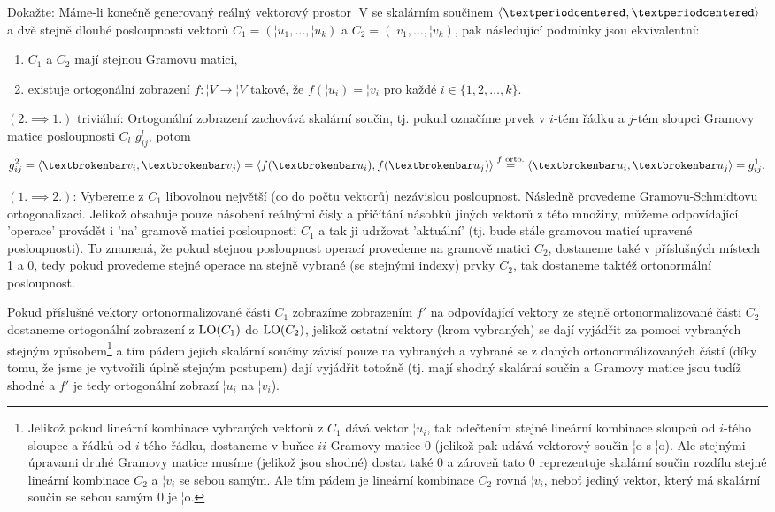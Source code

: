 \documentclass[10pt]{article}                   %
\begin{document}
\begin{priklad}[3.2*]
    Dokažte: Máme-li konečně generovaný reálný vektorový prostor ¦V se skalárním součinem $\<·, ·\>$ a dvě stejně dlouhé posloupnosti vektorů $C_1 = (¦u_1, …, ¦u_k)$ a $C_2 = (¦v_1, …, ¦v_k)$, pak následující podmínky jsou ekvivalentní:
    
    \begin{enumerate}
        \item $C_1$ a $C_2$ mají stejnou Gramovu matici,

        \item existuje ortogonální zobrazení $f: ¦V \rightarrow ¦V$ takové, že $f(¦u_i) = ¦v_i$ pro každé $i \in \{1, 2, …, k\}$.
    \end{enumerate}

    \begin{dukazin}
        $(2. \implies 1.)$ triviální: Ortogonální zobrazení zachovává skalární součin, tj. pokud označíme prvek v $i$-tém řádku a $j$-tém sloupci Gramovy matice posloupnosti $C_l$ $g^l_{ij}$, potom
        $$ g^2_{ij} = \<¦v_i, ¦v_j\> = \<f(¦u_i), f(¦u_j)\> \overset{\text{$f$ orto.}}{=} \<¦u_i, ¦u_j\> = g^1_{ij}. $$

        $(1. \implies 2.)$: Vybereme z $C_1$ libovolnou největší (co do počtu vektorů) nezávislou posloupnost. Následně provedeme Gramovu-Schmidtovu ortogonalizaci. Jelikož obsahuje pouze násobení reálnými čísly a přičítání násobků jiných vektorů z této množiny, můžeme odpovídající 'operace' provádět i 'na' gramově matici posloupnosti $C_1$ a tak ji udržovat 'aktuální' (tj. bude stále gramovou maticí upravené posloupnosti). To znamená, že pokud stejnou posloupnost operací provedeme na gramově matici $C_2$, dostaneme také v příslušných místech 1 a 0, tedy pokud provedeme stejné operace na stejně vybrané (se stejnými indexy) prvky $C_2$, tak dostaneme taktéž ortonormální posloupnost.

        Pokud příslušné vektory ortonormalizované části $C_1$ zobrazíme zobrazením $f'$ na odpovídající vektory ze stejně ortonormalizované části $C_2$ dostaneme ortogonální zobrazení z $\operatorname{LO}(C_1)$ do $\operatorname{LO}(C_2)$, jelikož ostatní vektory (krom vybraných) se dají vyjádřit za pomoci vybraných stejným způsobem\footnote{Jelikož pokud lineární kombinace vybraných vektorů z $C_1$ dává vektor $¦u_i$, tak odečtením stejné lineární kombinace sloupců od $i$-tého sloupce a řádků od $i$-tého řádku, dostaneme v buňce $ii$ Gramovy matice 0 (jelikož pak udává vektorový součin ¦o s ¦o). Ale stejnými úpravami druhé Gramovy matice musíme (jelikož jsou shodné) dostat také 0 a zároveň tato 0 reprezentuje skalární součin rozdílu stejné lineární kombinace $C_2$ a $¦v_i$ se sebou samým. Ale tím pádem je lineární kombinace $C_2$ rovná $¦v_i$, neboť jediný vektor, který má skalární součin se sebou samým 0 je ¦o.} a tím pádem jejich skalární součiny závisí pouze na vybraných a vybrané se z daných ortonormálizovaných částí (díky tomu, že jsme je vytvořili úplně stejným postupem) dají vyjádřit totožně (tj. mají shodný skalární součin a Gramovy matice jsou tudíž shodné a $f'$ je tedy ortogonální zobrazí $¦u_i$ na $¦v_i$).


\end{dukazin}
\end{priklad}
\end{document}
